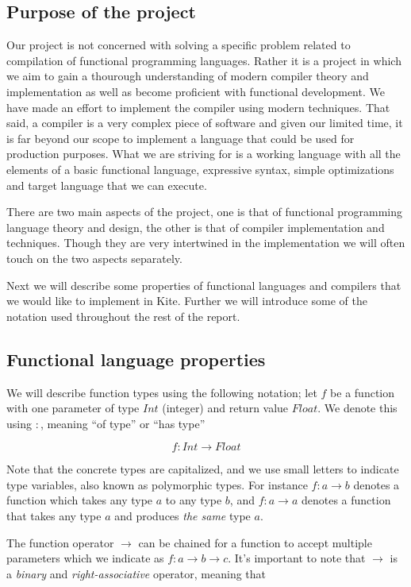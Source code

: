 
\subsection{Purpose of the project}
Our project is not concerned with solving a specific problem related to compilation of functional programming languages. Rather it is a project in which we aim to gain a thourough understanding of modern compiler theory and implementation as well as become proficient with functional development. We have made an effort to implement the compiler using modern techniques. That said, a compiler is a very complex piece of software and given our limited time, it is far beyond our scope to implement a language that could be used for production purposes. What we are striving for is a working language with all the elements of a basic functional language, expressive syntax, simple optimizations and target language that we can execute.

There are two main aspects of the project, one is that of functional programming language theory and design, the other is that of compiler implementation and techniques. Though they are very intertwined in the implementation we will often touch on the two aspects separately.

Next we will describe some properties of functional languages and compilers that we would like to implement in Kite. Further we will introduce some of the notation used throughout the rest of the report.

\subsection{Functional language properties}
We will describe function types using the following notation; let $f$ be a function with one parameter of type $Int$ (integer) and return value $Float$. We denote this using $:$, meaning ``of type'' or ``has type''

\[ f: Int \to Float \]

Note that the concrete types are capitalized, and we use small letters to indicate type variables, also known as polymorphic types. For instance $f: a \to b$ denotes a function which takes any type $a$ to any type $b$, and $f: a \to a$ denotes a function that takes any type $a$ and produces \emph{the same} type $a$.

The function operator $\to$ can be chained for a function to accept multiple parameters which we indicate as $f: a \to b \to c$. It's important to note that $\to$ is a \emph{binary} and \emph{right-associative} operator, meaning that

